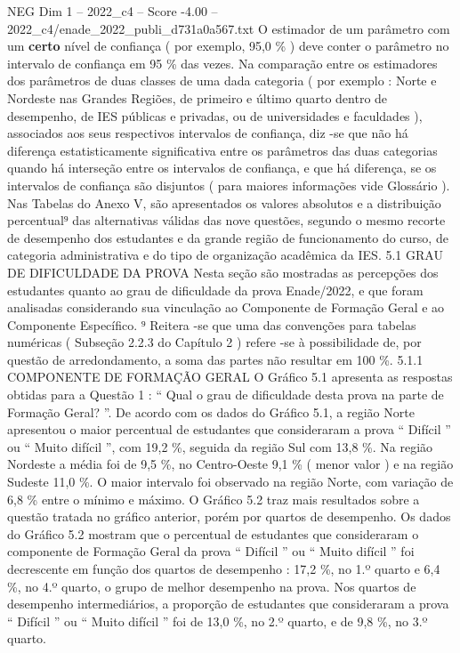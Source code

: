 \begin{textsample}{NEG Dim 1 – 2022\_c4 – Score -4.00 – 2022\_c4/enade\_2022\_publi\_d731a0a567.txt}
O estimador de um parâmetro com um \textbf{certo} nível de confiança ( por exemplo, 95,0 \% ) deve conter o parâmetro no intervalo de confiança em 95 \% das vezes.
Na comparação entre os estimadores dos parâmetros de duas classes de uma dada categoria ( por exemplo : Norte e Nordeste nas Grandes Regiões, de primeiro e último quarto dentro de desempenho, de IES públicas e privadas, ou de universidades e faculdades ), associados aos seus respectivos intervalos de confiança, diz -se que não há diferença estatisticamente significativa entre os parâmetros das duas categorias quando há interseção entre os intervalos de confiança, e que há diferença, se os intervalos de confiança são disjuntos ( para maiores informações vide Glossário ).
Nas Tabelas do Anexo V, são apresentados os valores absolutos e a distribuição percentual⁹ das alternativas válidas das nove questões, segundo o mesmo recorte de desempenho dos estudantes e da grande região de funcionamento do curso, de categoria administrativa e do tipo de organização acadêmica da IES. 5.1 GRAU DE DIFICULDADE DA PROVA Nesta seção são mostradas as percepções dos estudantes quanto ao grau de dificuldade da prova Enade/2022, e que foram analisadas considerando sua vinculação ao Componente de Formação Geral e ao Componente Específico. ⁹ Reitera -se que uma das convenções para tabelas numéricas ( Subseção 2.2.3 do Capítulo 2 ) refere -se à possibilidade de, por questão de arredondamento, a soma das partes não resultar em 100 \%. 5.1.1 COMPONENTE DE FORMAÇÃO GERAL O Gráfico 5.1 apresenta as respostas obtidas para a Questão 1 : “ Qual o grau de dificuldade desta prova na parte de Formação Geral? ”.
De acordo com os dados do Gráfico 5.1, a região Norte apresentou o maior percentual de estudantes que consideraram a prova “ Difícil ” ou “ Muito difícil ”, com 19,2 \%, seguida da região Sul com 13,8 \%.
Na região Nordeste a média foi de 9,5 \%, no Centro-Oeste 9,1 \% ( menor valor ) e na região Sudeste 11,0 \%.
O maior intervalo foi observado na região Norte, com variação de 6,8 \% entre o mínimo e máximo.
O Gráfico 5.2 traz mais resultados sobre a questão tratada no gráfico anterior, porém por quartos de desempenho.
Os dados do Gráfico 5.2 mostram que o percentual de estudantes que consideraram o componente de Formação Geral da prova “ Difícil ” ou “ Muito difícil ” foi decrescente em função dos quartos de desempenho : 17,2 \%, no 1.º quarto e 6,4 \%, no 4.º quarto, o grupo de melhor desempenho na prova.
Nos quartos de desempenho intermediários, a proporção de estudantes que consideraram a prova “ Difícil ” ou “ Muito difícil ” foi de 13,0 \%, no 2.º quarto, e de 9,8 \%, no 3.º quarto.

\end{textsample}
